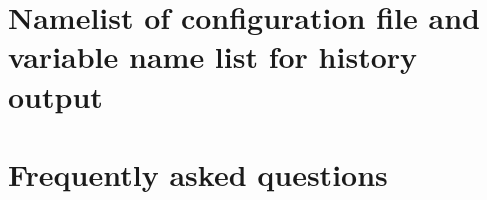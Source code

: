 \documentclass[a4paper]{report}
\begin{document}
\begin{appendix}
%
\chapter{Namelist of configuration file and variable name list for history output} \label{achap:namelist}

\chapter{Frequently asked questions} \label{achap:practice}


\end{appendix}

\ClearWallPaper

\end{document}
